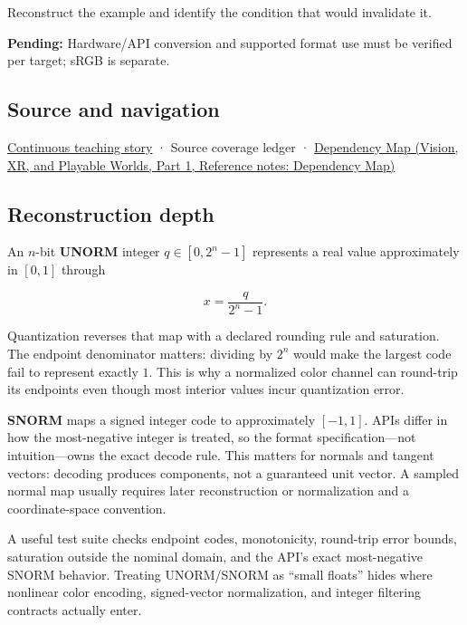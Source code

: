 \hypertarget{appendix-b2402c453dac-recall-and-next-depth}{}

Reconstruct the example and identify the condition that would invalidate it.

\textbf{Pending:} Hardware/API conversion and supported format use must be verified per target; sRGB is separate.

\subsection{Source and navigation}\label{appendix-b2402c453dac-source-and-navigation}

\hypertarget{appendix-b2402c453dac-source-and-navigation}{}

\hyperref[01-foundations-i-ch001-choosing-what-information-to-keep]{Continuous teaching story} · {Source coverage ledger} · \href{../07-Vision-XR-and-Playable-Worlds-P01/main.pdf\#appendix-4ad47bdd269a}{Dependency Map (Vision, XR, and Playable Worlds, Part 1, Reference notes: Dependency Map)}

\subsection{Reconstruction depth}\label{appendix-b2402c453dac-reconstruction-depth}

\hypertarget{appendix-b2402c453dac-reconstruction-depth}{}

An \(n\)-bit \textbf{UNORM} integer \(q\in[0,2^n-1]\) represents a real value approximately in \([0,1]\) through

\[
x = \frac{q}{2^n-1}.
\]

Quantization reverses that map with a declared rounding rule and saturation. The endpoint denominator matters: dividing by \(2^n\) would make the largest code fail to represent exactly \(1\). This is why a normalized color channel can round-trip its endpoints even though most interior values incur quantization error.

\textbf{SNORM} maps a signed integer code to approximately \([-1,1]\). APIs differ in how the most-negative integer is treated, so the format specification---not intuition---owns the exact decode rule. This matters for normals and tangent vectors: decoding produces components, not a guaranteed unit vector. A sampled normal map usually requires later reconstruction or normalization and a coordinate-space convention.

A useful test suite checks endpoint codes, monotonicity, round-trip error bounds, saturation outside the nominal domain, and the API's exact most-negative SNORM behavior. Treating UNORM/SNORM as ``small floats'' hides where nonlinear color encoding, signed-vector normalization, and integer filtering contracts actually enter.
